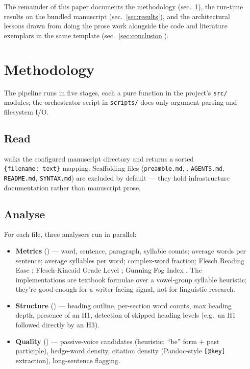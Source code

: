 \documentclass[
]{article}
\begin{document}
The remainder of this paper documents the methodology
(sec.~\ref{sec:methodology}), the run-time results on the bundled
manuscript (sec.~\ref{sec:results}), and the architectural lessons drawn
from doing the prose work alongside the code and literature exemplars in
the same template (sec.~\ref{sec:conclusion}).

\newpage

\section{Methodology}\label{sec:methodology}

The pipeline runs in five stages, each a pure function in the project's
\texttt{src/} modules; the orchestrator script in \texttt{scripts/} does
only argument parsing and filesystem I/O.

\subsection{Read}\label{read}

 walks the configured
manuscript directory and returns a sorted \texttt{\{filename:\ text\}}
mapping. Scaffolding files (\texttt{preamble.md},
, \texttt{AGENTS.md}, \texttt{README.md},
\texttt{SYNTAX.md}) are excluded by default --- they hold infrastructure
documentation rather than manuscript prose.

\subsection{Analyse}\label{analyse}

For each file, three analysers run in parallel:

\begin{itemize}
\item
  \textbf{Metrics} () ---
  word, sentence, paragraph, syllable counts; average words per
  sentence; average syllables per word; complex-word fraction; Flesch
  Reading Ease \citep{flesch1948new}; Flesch-Kincaid Grade Level
  \citep{kincaid1975derivation}; Gunning Fog Index
  \citep{gunning1952technique}. The implementations are textbook
  formulae over a vowel-group syllable heuristic; they're good enough
  for a writer-facing signal, not for linguistic research.
\item
  \textbf{Structure} ()
  --- heading outline, per-section word counts, max heading depth,
  presence of an H1, detection of skipped heading levels (e.g.~an H1
  followed directly by an H3).
\item
  \textbf{Quality} () ---
  passive-voice candidates (heuristic: ``be'' form + past participle),
  hedge-word density, citation density (Pandoc-style \texttt{{[}@key{]}}
  extraction), long-sentence flagging.
\end{itemize}
\end{document}
